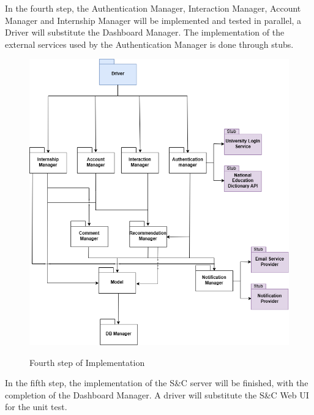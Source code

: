 \documentclass[a4paper,12pt]{article}
\begin{document}
In the fourth step, the Authentication Manager, Interaction Manager, Account Manager and Internship Manager will be implemented and tested in parallel, a Driver will
substitute the Dashboard Manager. The implementation of the external services used by the Authentication Manager is done through stubs.

\begin{figure}[H]
\centering
\includegraphics[scale = 0.65]{DD_figures/ImplementationDiagrams/FourthStep.png}\\
\caption{Fourth step of Implementation}
\end{figure}
\newpage

In the fifth step, the implementation of the S\&C server will be finished, with the completion of the Dashboard Manager. A driver will substitute the S\&C Web UI for the unit test.
\end{document}
